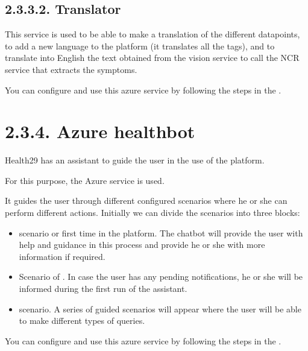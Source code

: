 \documentclass[letterpaper,10pt,english]{sphinxmanual}
\begin{document}
\subsection{2.3.3.2. Translator}
\label{\detokenize{pages/SW/Components:translator}}
This service is used to be able to make a translation of the different datapoints, to add a new language to the platform (it translates all the tags), and to translate into English the text obtained from the vision service to call the NCR service that extracts the symptoms.

You can configure and use this azure service by following the steps in the .


\section{2.3.4. Azure healthbot}
\label{\detokenize{pages/SW/Components:azure-healthbot}}
Health29 has an assistant to guide the user in the use of the platform.



For this purpose, the Azure  service is used.

It guides the user through different configured scenarios where he or she can perform different actions. Initially we can divide the scenarios into three blocks:
\begin{itemize}
\item {} 
 scenario or first time in the platform. The chatbot will provide the user with help and guidance in this process and provide he or she with more information if required.

\item {} 
Scenario of . In case the user has any pending notifications, he or she will be informed during the first run of the assistant.

\item {} 
 scenario. A series of guided scenarios will appear where the user will be able to make different types of queries.

\end{itemize}

You can configure and use this azure service by following the steps in the .
\end{document}
